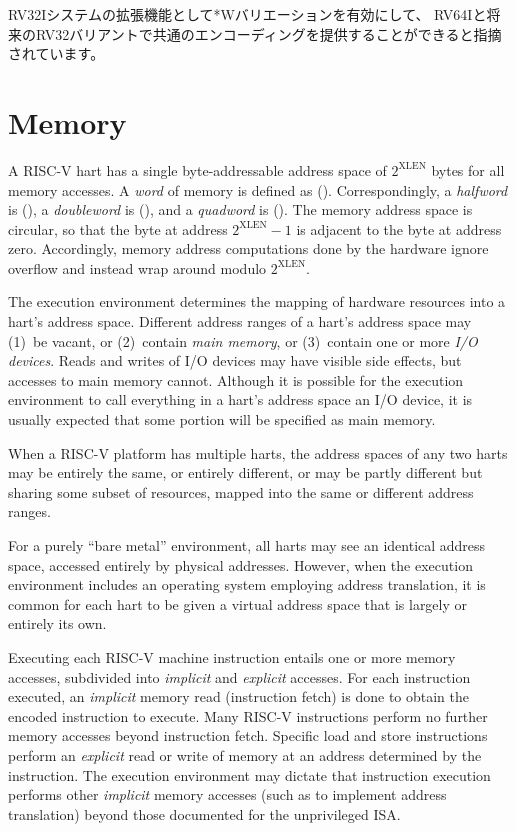 \begin{commentary}
RV32Iシステムの拡張機能として*Wバリエーションを有効にして、
RV64Iと将来のRV32バリアントで共通のエンコーディングを提供することができると指摘されています。
\end{commentary}

\section{Memory}

A RISC-V hart has a single byte-addressable address space
of $2^{\text{XLEN}}$ bytes for all memory
accesses.  A {\em word} of memory is defined as 
().  Correspondingly, a {\em halfword} is 
(), a {\em doubleword} is 
(), and a {\em quadword} is 
().
The memory address space is circular, so that the byte at address
$2^{\text{XLEN}}-1$ is adjacent to the byte at address zero.  Accordingly, memory
address computations done by the hardware ignore overflow and instead
wrap around modulo $2^{\text{XLEN}}$.


The execution environment determines the mapping of hardware resources into
a hart's address space.
Different address ranges of a hart's address space may (1)~be vacant, or
(2)~contain {\em main memory}, or (3)~contain one or more {\em I/O devices}.
Reads and writes of I/O devices may have visible side effects, but accesses
to main memory cannot.
Although it is possible for the execution environment to call everything in
a hart's address space an I/O device, it is usually expected that some
portion will be specified as main memory.

When a RISC-V platform has multiple harts, the address spaces of any two
harts may be entirely the same, or entirely different, or may be partly
different but sharing some subset of resources, mapped into the same or
different address ranges.

\begin{commentary}
For a purely ``bare metal'' environment, all harts may see an identical
address space, accessed entirely by physical addresses.
However, when the execution environment includes an operating system
employing address translation, it is common for each hart to be given a
virtual address space that is largely or entirely its own.
\end{commentary}

Executing each RISC-V machine instruction entails one or more memory
accesses, subdivided into {\em
implicit} and {\em explicit} accesses.  For each instruction executed, an {\em
implicit} memory read (instruction fetch) is done to obtain the encoded
instruction to execute.  Many RISC-V instructions perform no further memory
accesses beyond instruction fetch.  Specific load and store instructions
perform an {\em explicit} read or write of memory at an address determined by
the instruction.  The execution environment may dictate that instruction
execution performs other {\em implicit} memory accesses (such as to implement
address translation) beyond those documented for the unprivileged ISA.

